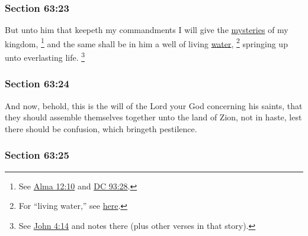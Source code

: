 	\subsubsection{Section 63:23} %
		\label{DC63-23}

		But unto him that keepeth my commandments I will give the \hyperref[MYSTERY]{mysteries} of my kingdom,%
			\footnote{%
				See \hyperref[ALMA-12-10]{Alma 12:10} and \hyperref[DC93-28]{DC 93:28}.
				}
		and the same shall be in him a well of living \hyperref[WATER]{water},%
			\footnote{%
				For ``living water,'' see \hyperref[WATER-PHRASES]{here}.
				}
		springing up unto everlasting life.%
			\footnote{%
				See \hyperref[JOHN-4-14]{John 4:14} and notes there (plus other verses in that story).
				}


	\subsubsection{Section 63:24} %
		\label{DC63-24}

		And now, behold, this is the will of the Lord your God concerning his saints, that they should assemble themselves together unto the land of Zion, not in haste, lest there should be confusion, which bringeth pestilence.


	\subsubsection{Section 63:25} %
		\label{DC63-25}

